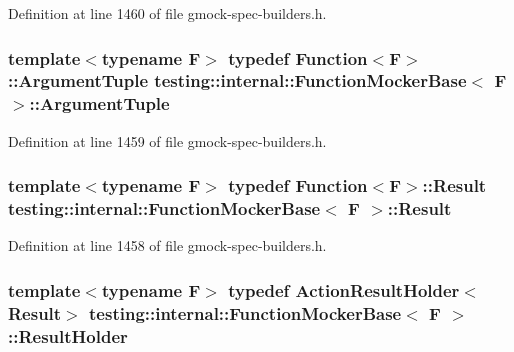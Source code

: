 Definition at line 1460 of file gmock-\/spec-\/builders.\+h.

\subsubsection[{\texorpdfstring{Argument\+Tuple}{ArgumentTuple}}]{\setlength{\rightskip}{0pt plus 5cm}template$<$typename F$>$ typedef {\bf Function}$<$F$>$\+::{\bf Argument\+Tuple} {\bf testing\+::internal\+::\+Function\+Mocker\+Base}$<$ F $>$\+::{\bf Argument\+Tuple}}\hypertarget{classtesting_1_1internal_1_1_function_mocker_base_a336432a07e544af4ffb8103603471ca3}{}\label{classtesting_1_1internal_1_1_function_mocker_base_a336432a07e544af4ffb8103603471ca3}


Definition at line 1459 of file gmock-\/spec-\/builders.\+h.

\subsubsection[{\texorpdfstring{Result}{Result}}]{\setlength{\rightskip}{0pt plus 5cm}template$<$typename F$>$ typedef {\bf Function}$<$F$>$\+::{\bf Result} {\bf testing\+::internal\+::\+Function\+Mocker\+Base}$<$ F $>$\+::{\bf Result}}\hypertarget{classtesting_1_1internal_1_1_function_mocker_base_aa50abc4055b4d3a14ad64c317bccec8d}{}\label{classtesting_1_1internal_1_1_function_mocker_base_aa50abc4055b4d3a14ad64c317bccec8d}


Definition at line 1458 of file gmock-\/spec-\/builders.\+h.

\subsubsection[{\texorpdfstring{Result\+Holder}{ResultHolder}}]{\setlength{\rightskip}{0pt plus 5cm}template$<$typename F$>$ typedef {\bf Action\+Result\+Holder}$<${\bf Result}$>$ {\bf testing\+::internal\+::\+Function\+Mocker\+Base}$<$ F $>$\+::{\bf Result\+Holder}\hspace{0.3cm}{\ttfamily [protected]}}\hypertarget{classtesting_1_1internal_1_1_function_mocker_base_aa4e1b2ee217676c9e70c3006b19a8074}{}\label{classtesting_1_1internal_1_1_function_mocker_base_aa4e1b2ee217676c9e70c3006b19a8074}


